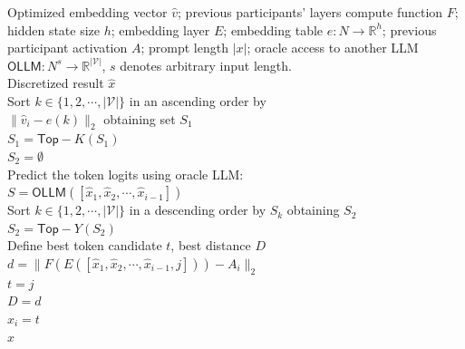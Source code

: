 \begin{algorithm}[!h]
   \caption{\emph{Adaptive Discretization}}
   \label{alg:discrete}
\begin{algorithmic}
    Optimized embedding vector $\hat{v}$; previous participants' layers compute function $F$; hidden state size $h$; embedding layer $E$; embedding table $e:N\to \mathbb{R}^h$; previous participant activation $A$; prompt length $|x|$;  oracle access to another LLM $\mathsf{OLLM}: N^s\to \mathbb{R}^{|\mathcal{V}|}$, $s$ denotes arbitrary input length. 
   \\
   Discretized  result $\hat{x}$ \\
    \STATE Sort $k\in \{1,2,\cdots,|\mathcal{V}|\}$ in an ascending order by  \\
    \STATE $\|\hat{v}_i-e(k)\|_2$ obtaining set $S_1$\\
    \STATE $S_1=\mathsf{Top}-K(S_1)$\\
    \STATE $S_2=\emptyset$\\
    \STATE Predict the token logits using oracle LLM: \\
    \STATE $S=\mathsf{OLLM}([\hat{x}_1,\hat{x}_2,\cdots,\hat{x}_{i-1}])$\\
     \STATE Sort $k\in \{1,2,\cdots,|\mathcal{V}|\}$ in a descending order by $S_k$   obtaining $S_2$\\
     \STATE $S_2=\mathsf{Top}-Y(S_2)$\\
    \ENDIF
    \STATE Define best token candidate $t$, best distance $D$ \\
    \STATE $d=\|F(E([\hat{x}_1,\hat{x}_2,\cdots,\hat{x}_{i-1},j]))-A_i\|_2$\\
    \STATE $t=j$\\
    \STATE $D=d$\\
    
    \ENDIF
    \ENDFOR
    \STATE $\hat{x}_i=t$\\
    \ENDFOR
    \RETURN $\hat{x}$\\
\end{algorithmic}
\end{algorithm}


